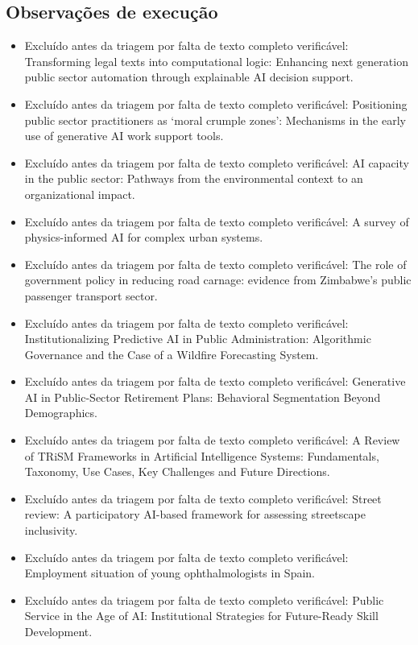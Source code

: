 \documentclass[12pt,a4paper]{article}
\begin{document}
\subsection{Observações de execução}
\label{sec:org527ae93}

\begin{itemize}
\item Excluído antes da triagem por falta de texto completo verificável: Transforming legal texts into computational logic: Enhancing next generation public sector automation through explainable AI decision support.
\item Excluído antes da triagem por falta de texto completo verificável: Positioning public sector practitioners as ‘moral crumple zones’: Mechanisms in the early use of generative AI work support tools.
\item Excluído antes da triagem por falta de texto completo verificável: AI capacity in the public sector: Pathways from the environmental context to an organizational impact.
\item Excluído antes da triagem por falta de texto completo verificável: A survey of physics-informed AI for complex urban systems.
\item Excluído antes da triagem por falta de texto completo verificável: The role of government policy in reducing road carnage: evidence from Zimbabwe’s public passenger transport sector.
\item Excluído antes da triagem por falta de texto completo verificável: Institutionalizing Predictive AI in Public Administration: Algorithmic Governance and the Case of a Wildfire Forecasting System.
\item Excluído antes da triagem por falta de texto completo verificável: Generative AI in Public-Sector Retirement Plans: Behavioral Segmentation Beyond Demographics.
\item Excluído antes da triagem por falta de texto completo verificável: A Review of TRiSM Frameworks in Artificial Intelligence Systems: Fundamentals, Taxonomy, Use Cases, Key Challenges and Future Directions.
\item Excluído antes da triagem por falta de texto completo verificável: Street review: A participatory AI-based framework for assessing streetscape inclusivity.
\item Excluído antes da triagem por falta de texto completo verificável: Employment situation of young ophthalmologists in Spain.
\item Excluído antes da triagem por falta de texto completo verificável: Public Service in the Age of AI: Institutional Strategies for Future-Ready Skill Development.

\end{itemize}
\end{document}
